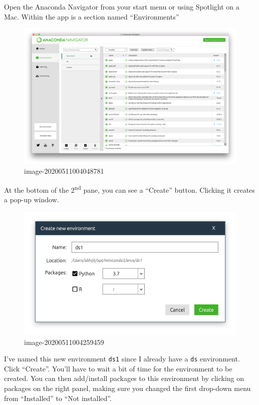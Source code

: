 \documentclass[
  letterpaper,
]{scrbook}
\begin{document}
Open the Anaconda Navigator from your start menu or using Spotlight on a Mac. Within the app is a section named ``Environments''

\begin{figure}
\centering
\includegraphics{graphs/AN_env_1.png}
\caption{image-20200511004048781}
\end{figure}

At the bottom of the 2\textsuperscript{nd} pane, you can see a ``Create'' button. Clicking it creates a pop-up window.

\begin{figure}
\centering
\includegraphics{graphs/AN_env_2.png}
\caption{image-20200511004259459}
\end{figure}

I've named this new environment \texttt{ds1} since I already have a \texttt{ds} environment. Click ``Create''. You'll have to wait a bit of time for the environment to be created. You can then add/install packages to this environment by clicking on packages on the right panel, making sure you changed the first drop-down menu from ``Installed'' to ``Not installed''.
\end{document}
